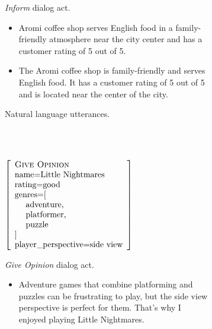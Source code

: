 \begin{figure}[p]
\center
\begin{subfigure}{.35\textwidth}
\center
{}
    {}
    {}
    {}
    {}
    {}
    {}
 
\caption{\emph{Inform} dialog act.}\label{fig:informexample}
\end{subfigure}\hfill \begin{subfigure}{.58\textwidth}
\begin{itemize}
\item Aromi coffee shop serves English food in a family-friendly atmosphere near the city center and has a customer rating of 5 out of 5.
\item The Aromi coffee shop is family-friendly and serves English food.  It has a customer rating of 5 out of 5 and is located near the center of the city.
\end{itemize}
\caption{Natural language utterances.}
\label{fig:mr1utt}
\end{subfigure}



~\\~\\

\begin{subfigure}{.35\textwidth}
\center
$\left[\begin{array}{l} 
    \textsc{Give Opinion} \\ 
    \textrm{name=Little Nightmares} \\
    \textrm{rating=good} \\
    \textrm{genres=[}\\
    \textrm{~~~~adventure,} \\
    \textrm{~~~~platformer,}\\
    \textrm{~~~~puzzle} \\
    \textrm{]} \\
    \textrm{player\_perspective=side view}
\end{array}\right]$ 
\caption{\emph{Give Opinion} dialog act.}\label{fig:giveopinionexample}
\end{subfigure}\hfill \begin{subfigure}{.58\textwidth}
\begin{itemize}
    \item Adventure games that combine platforming and puzzles can be frustrating to play, but the side view perspective is perfect for them. That's why I enjoyed playing Little Nightmares.


\end{itemize}
\end{subfigure}
\end{figure}
